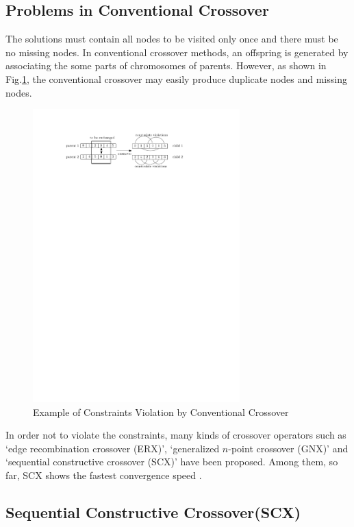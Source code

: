 \subsection{Problems in Conventional Crossover}

The solutions must contain all nodes to be visited only once and there must be no missing nodes. In conventional crossover methods, an offspring is generated by associating the some parts of chromosomes of parents. However, as shown in Fig.\ref{fig:constraintsViolation}, the conventional crossover may easily produce duplicate nodes and missing nodes.


\begin{figure}
\centering
\includegraphics[width=8.0cm]{constraintsViolation.pdf}
\caption{Example of Constraints Violation by Conventional Crossover}
\label{fig:constraintsViolation}
\end{figure}

In order not to violate the constraints, many kinds of crossover operators such as `edge recombination crossover (ERX)', `generalized $n$-point crossover (GNX)' and `sequential constructive crossover (SCX)' have been proposed. Among them, so far, SCX shows the fastest convergence speed \cite{ahmed2010genetic}.

\subsection{Sequential Constructive Crossover(SCX)}

